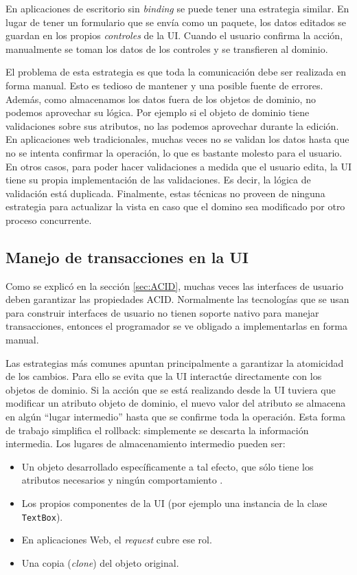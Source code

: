 	En aplicaciones de escritorio sin \emph{binding} se puede tener una estrategia
	similar. En lugar de tener un formulario que se envía como un paquete, los
	datos editados se guardan en los propios \emph{controles} de la UI. Cuando el
	usuario confirma la acción, manualmente se toman los datos de los controles y se transfieren al dominio.

	\medskip
	
	El problema de esta estrategia es que toda la comunicación debe ser realizada
	en forma manual. Esto es tedioso de mantener y una posible fuente de errores.
	Además, como almacenamos los datos fuera de los objetos de dominio, no podemos
	aprovechar su lógica. Por ejemplo si el objeto de dominio tiene validaciones
	sobre sus atributos, no las podemos aprovechar durante la edición. En
	aplicaciones web tradicionales, muchas veces no se validan los datos hasta que
	no se intenta confirmar la operación, lo que es bastante molesto para el
	usuario. En otros casos, para poder hacer validaciones a medida que el usuario
	edita, la UI tiene su propia implementación de las validaciones. 
	Es decir, la lógica de validación está duplicada.
	Finalmente, estas técnicas no proveen de ninguna estrategia para actualizar 
	la vista en caso que el domino sea modificado por otro proceso concurrente.
	 		
\subsection{Manejo de transacciones en la UI}
	Como se explicó en la sección \ref{sec:ACID}, muchas veces las interfaces de
	usuario deben garantizar las propiedades ACID.
	Normalmente las tecnologías que se usan para construir interfaces de usuario no
	tienen soporte nativo para manejar transacciones, entonces el programador se ve
	obligado a implementarlas en forma manual.
	
	Las estrategias más comunes apuntan principalmente a garantizar la atomicidad
	de los cambios. Para ello se evita que la UI interactúe
	directamente con los objetos de dominio. Si la acción que se está realizando
	desde la UI tuviera que modificar un atributo objeto de dominio, el nuevo valor
	del atributo se almacena en algún ``lugar intermedio'' hasta que se confirme toda
	la operación. Esta forma de trabajo simplifica el rollback: simplemente se
	descarta la información intermedia. Los lugares de almacenamiento intermedio
	pueden ser:
	\begin{itemize}
	  \item Un objeto desarrollado específicamente a tal efecto, que sólo tiene los
	  atributos necesarios y ningún comportamiento \citep[Sección Data Transfer Object]{fowler2002a}.
	  \item Los propios componentes de la UI (por
	  ejemplo una instancia de la clase \texttt{TextBox}).
	  \item En aplicaciones Web, el \emph{request} cubre ese rol.
	  \item Una copia (\emph{clone}) del objeto original.
	\end{itemize}
	
